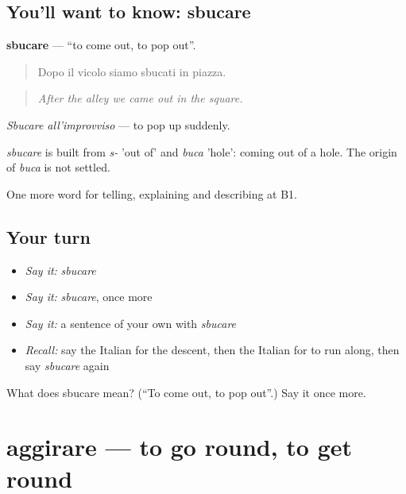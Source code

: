 \subsection*{You'll want to know: sbucare}
\textbf{sbucare} — \textquotedblleft{}to come out, to pop out\textquotedblright{}.

\begin{quote}
Dopo il vicolo siamo sbucati in piazza.
\end{quote}

\begin{quote}
\emph{After the alley we came out in the square.}
\end{quote}

\emph{Sbucare all'improvviso} — to pop up suddenly.

\begin{cousinweb}
\emph{sbucare} is built from \emph{s-} 'out of' and \emph{buca} 'hole': coming out of a hole. The origin of \emph{buca} is not settled.
\end{cousinweb}

\begin{grammarlens}[title={What you've built}]
One more word for telling, explaining and describing at B1.
\end{grammarlens}

\subsection*{Your turn}
\begin{itemize}
\raggedright
  \item \emph{Say it:} \emph{sbucare}
  \item \emph{Say it:} \emph{sbucare}, once more
  \item \emph{Say it:} a sentence of your own with \emph{sbucare}
  \item \emph{Recall:} say the Italian for the descent, then the Italian for to run along, then say \emph{sbucare} again
\end{itemize}

\begin{tcolorbox}[breakable,colback=teal!4,colframe=teal!35!black,title={Before you move on}]
What does sbucare mean? (\textquotedblleft{}To come out, to pop out\textquotedblright{}.) Say it once more.
\end{tcolorbox}
\section[aggirare]{aggirare — to go round, to get round}

